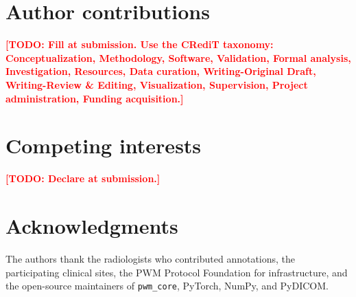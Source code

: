 \documentclass[twoside,11pt]{article}
\newcommand{\todo}[1]{\textcolor{red}{\textbf{[TODO: #1]}}}
\begin{document}
\section*{Author contributions}

\todo{Fill at submission. Use the CRediT taxonomy: Conceptualization, Methodology, Software, Validation, Formal analysis, Investigation, Resources, Data curation, Writing-Original Draft, Writing-Review \& Editing, Visualization, Supervision, Project administration, Funding acquisition.}

\section*{Competing interests}

\todo{Declare at submission.}

\section*{Acknowledgments}

The authors thank the radiologists who contributed annotations, the participating clinical sites, the PWM Protocol Foundation for infrastructure, and the open-source maintainers of \texttt{pwm\_core}, PyTorch, NumPy, and PyDICOM.



\end{document}
